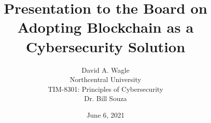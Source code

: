\title{Presentation to the Board on Adopting Blockchain as a Cybersecurity Solution}
\author{David A. Wagle \\
Northcentral University \\ TIM-8301: Principles of Cybersecurity \\ Dr. Bill Souza}
\date{June 6, 2021}
